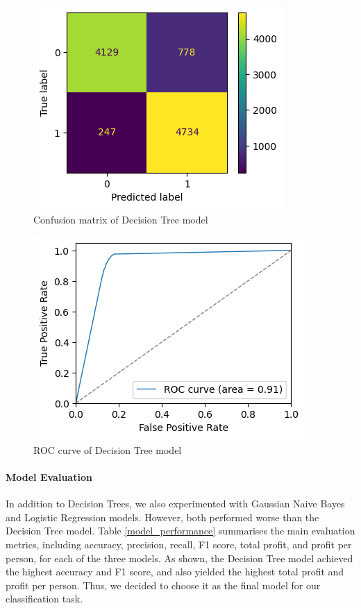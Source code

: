 \documentclass[twocolumn]{article}
\begin{document}
    \begin{figure}[htbp]
        \centerline{\includegraphics[width=0.6\columnwidth]{images/dt-cm.png}}
        \caption{Confusion matrix of Decision Tree model}
        \label{dt-cm}
    \end{figure}

    \begin{figure}[htbp]
        \centerline{\includegraphics[width=0.7\columnwidth]{images/dt-roc.png}}
        \caption{ROC curve of Decision Tree model}
        \label{dt-roc}
    \end{figure}

    \paragraph{Model Evaluation}
    In addition to Decision Trees, we also experimented with Gaussian Naive Bayes and Logistic Regression models. However, both performed worse than the Decision Tree model. Table \ref{model_performance} summarises the main evaluation metrics, including accuracy, precision, recall, F1 score, total profit, and profit per person, for each of the three models. As shown, the Decision Tree model achieved the highest accuracy and F1 score, and also yielded the highest total profit and profit per person. Thus, we decided to choose it as the final model for our classification task.
\end{document}
